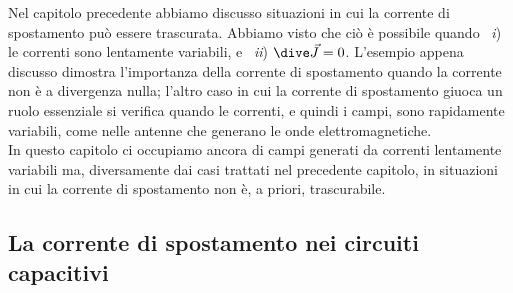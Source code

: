 Nel capitolo precedente abbiamo discusso situazioni in cui la corrente di
spostamento pu\`o essere trascurata. Abbiamo visto che ci\`o \`e possibile
quando \ \textit{i}) le correnti sono lentamente variabili, e \ \textit{ii})
$\dive\vec J=0$. L'esempio appena discusso dimostra l'importanza della corrente
di spostamento quando la corrente non \`e a divergenza nulla; l'altro caso in
cui la corrente di spostamento giuoca un ruolo essenziale si verifica quando le
correnti, e quindi i campi, sono rapidamente variabili, come nelle antenne che
generano le onde elettromagnetiche.\\
In questo capitolo ci occupiamo ancora di campi generati da correnti lentamente
variabili ma, diversamente dai casi trattati nel precedente capitolo, in
situazioni in cui la corrente di spostamento non \`e, a priori, trascurabile.

\subsection{La corrente di spostamento nei circuiti capacitivi}

